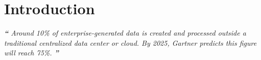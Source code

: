 \section{Introduction}
\begin{displayquote}
\textit{\textbf{\Huge{``}}
\large{Around 10\% of enterprise-generated data is created and processed outside a traditional centralized data center or cloud. By 2025, Gartner predicts this figure will reach 75\%.\cite{gartnerEdgeComputing:online}}
\textbf{\Huge{''}}}
\\[1pt]
\end{displayquote}




% 
% 
% 